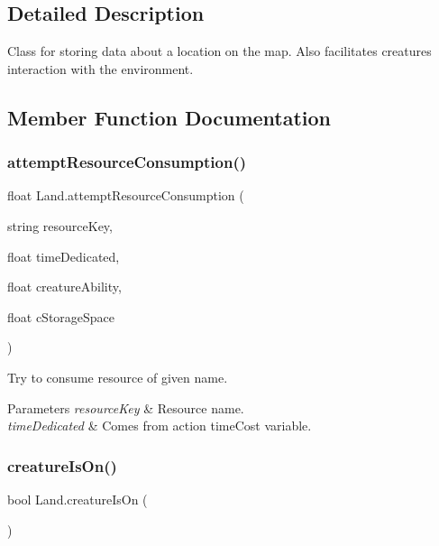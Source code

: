 \subsection{Detailed Description}
Class for storing data about a location on the map. Also facilitates creature\textquotesingle{}s interaction with the environment. 



\subsection{Member Function Documentation}
\mbox{\label{class_land_ad2eefda30f5859bb62fc33804f445e20}} 
\subsubsection{\texorpdfstring{attempt\+Resource\+Consumption()}{attemptResourceConsumption()}}
{\footnotesize\ttfamily float Land.\+attempt\+Resource\+Consumption (\begin{DoxyParamCaption}\item[{string}]{resource\+Key,  }\item[{float}]{time\+Dedicated,  }\item[{float}]{creature\+Ability,  }\item[{float}]{c\+Storage\+Space }\end{DoxyParamCaption})}



Try to consume resource of given name. 


\begin{DoxyParams}{Parameters}
{\em resource\+Key} & Resource name.\\
\hline
{\em time\+Dedicated} & Comes from action time\+Cost variable.\\
\hline
\end{DoxyParams}
\mbox{\label{class_land_ad66a06c6c305a42c12c5b63410242251}} 
\subsubsection{\texorpdfstring{creature\+Is\+On()}{creatureIsOn()}}
{\footnotesize\ttfamily bool Land.\+creature\+Is\+On (\begin{DoxyParamCaption}{ }\end{DoxyParamCaption})}



